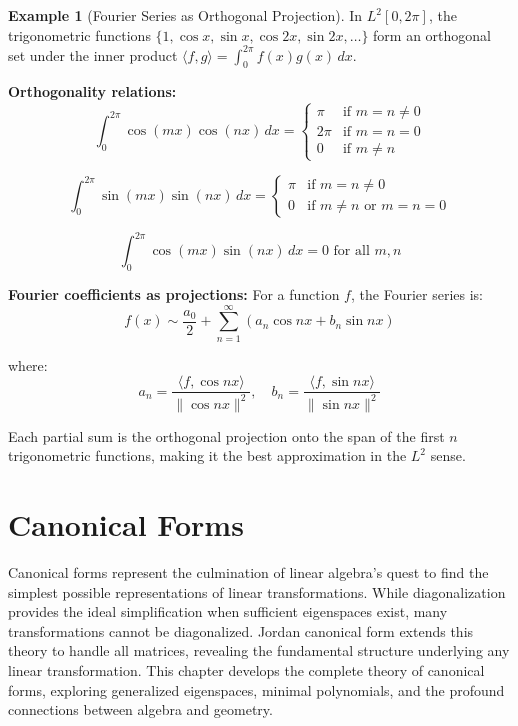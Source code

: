 \documentclass[12pt]{article}
\numberwithin{equation}{section}
\theoremstyle{plain}
\theoremstyle{definition}
\newtheorem{example}[theorem]{Example}
\theoremstyle{remark}
\begin{document}
\begin{example}[Fourier Series as Orthogonal Projection]
In $L^2[0, 2\pi]$, the trigonometric functions $\{1, \cos x, \sin x, \cos 2x, \sin 2x, \ldots\}$ form an orthogonal set under the inner product $\langle f, g \rangle = \int_0^{2\pi} f(x)g(x) \, dx$.

\textbf{Orthogonality relations:}
$$\int_0^{2\pi} \cos(mx) \cos(nx) \, dx = \begin{cases} \pi & \text{if } m = n \neq 0 \\ 2\pi & \text{if } m = n = 0 \\ 0 & \text{if } m \neq n \end{cases}$$

$$\int_0^{2\pi} \sin(mx) \sin(nx) \, dx = \begin{cases} \pi & \text{if } m = n \neq 0 \\ 0 & \text{if } m \neq n \text{ or } m = n = 0 \end{cases}$$

$$\int_0^{2\pi} \cos(mx) \sin(nx) \, dx = 0 \text{ for all } m, n$$

\textbf{Fourier coefficients as projections:}
For a function $f$, the Fourier series is:
$$f(x) \sim \frac{a_0}{2} + \sum_{n=1}^{\infty} (a_n \cos nx + b_n \sin nx)$$

where:
$$a_n = \frac{\langle f, \cos nx \rangle}{\|\cos nx\|^2}, \quad b_n = \frac{\langle f, \sin nx \rangle}{\|\sin nx\|^2}$$

Each partial sum is the orthogonal projection onto the span of the first $n$ trigonometric functions, making it the best approximation in the $L^2$ sense.
\end{example}

\newpage
\section{Canonical Forms}

Canonical forms represent the culmination of linear algebra's quest to find the simplest possible representations of linear transformations. While diagonalization provides the ideal simplification when sufficient eigenspaces exist, many transformations cannot be diagonalized. Jordan canonical form extends this theory to handle all matrices, revealing the fundamental structure underlying any linear transformation. This chapter develops the complete theory of canonical forms, exploring generalized eigenspaces, minimal polynomials, and the profound connections between algebra and geometry.
\end{document}
